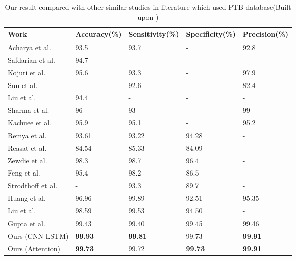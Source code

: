 \documentclass{ieeeaccess}
\begin{document}
\begin{table}[t]
    \centering%
    \caption{Our result compared with other similar studies in literature which used PTB database(Built upon \cite{10.1007/978-3-030-64610-3_40})}
    \label{tbl:tbl3}
    \small
    \begin{tabular}{*{5}{p{}}}
          \toprule
    \textbf{Work} &\textbf{Accuracy(\%)} &  \textbf{Sensitivity(\%)} &\textbf{Specificity(\%)} &\textbf{Precision(\%)}
      \\\midrule
    Acharya et al. \cite{ACHARYA2017190} & 93.5 & 93.7 & - & 92.8\\
     Safdarian et al. \cite{safdarain} &94.7 & - & - & -\\
     Kojuri et al. \cite{kojuri}&95.6 & 93.3 & - & 97.9 \\
     Sun et al. \cite{sun} & - & 92.6 & - & 82.4\\
      Liu et al. \cite{Liu94}& 94.4 & - & - & -\\
      Sharma et al. \cite{Sharma2018InferiorMI}& 96 & 93 & - & 99\\
      Kachuee et al. \cite{8419425}& 95.9 & 95.1 & - & 95.2\\
      Remya et al. \cite{remya}& 93.61 & 93.22 & 94.28 & -\\
    Reasat et al. \cite{reasat}& 84.54 & 85.33 & 84.09 & -\\
     Zewdie et al. \cite{zewdie2014fully}& 98.3 & 98.7 & 96.4 & -\\
      Feng et al. \cite{feng}& 95.4 & 98.2 & 86.5 & -\\
      Strodthoff et al. & - & 93.3 & 89.7 & -\\
      Huang et al.& 96.96 & 99.89 & 92.51 & 95.35\\
      Liu et al. \cite{liu} & 98.59 & 99.53 & 94.50 & -\\
     Gupta et al.\cite{10.1007/978-3-030-64610-3_40} & 99.43 & 99.40 & 99.45 & 99.46\\
     Ours (CNN-LSTM)& \textbf{99.93} & \textbf{99.81} & 99.73 & \textbf{99.91}\\
     Ours (Attention) & \textbf{99.73} & 99.72 & \textbf{99.73} & \textbf{99.91}\\    
     \bottomrule
    \end{tabular}
\end{table}
\end{document}

